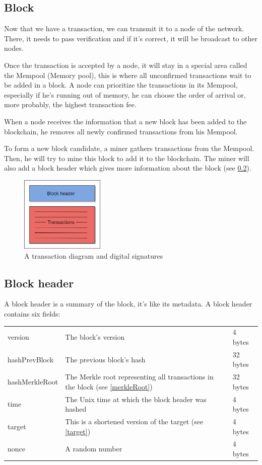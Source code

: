   \subsection{Block}

Now that we have a transaction, we can transmit it to a node of the network. There, it needs to pass verification and if it's correct, it will be broadcast to other nodes. \newline

Once the transaction is accepted by a node, it will stay in a special area called the Mempool (Memory pool), this is where all unconfirmed transactions wait to be added in a block. A node can prioritize the transactions in its Mempool, especially if he's running out of memory, he can choose the order of arrival or, more probably, the highest transaction fee.

When a node receives the information that a new block has been added to the blockchain, he removes all newly confirmed transactions from his Mempool.  \newline

To form a new block candidate, a miner gathers transactions from the Mempool. Then, he will try to mine this block to add it to the blockchain. The miner will also add a block header which gives more information about the block (see \ref{blockHeader}). \newline

\begin{figure}[ht]
\centering
\includegraphics[width=4cm]{Figures/block}
\caption{A transaction diagram and digital signatures}
\end{figure}


  \subsection{Block header} \label{blockHeader}

A block header is a summary of the block, it's like its metadata. A block header contains six fields: \newline

\begin{tabular}{lll}
   version & The block's version & 4 bytes\\
   hashPrevBlock & The previous block's hash & 32 bytes \\
   hashMerkleRoot & The Merkle root representing all transactions in the block (see \ref{merkleRoot}) & 32 bytes \\
   time & The Unix time at which the block header was hashed & 4 bytes \\
   target & This is a shortened version of the target (see \ref{target}) & 4 bytes \\
   nonce & A random number  & 4 bytes \\
\end{tabular}

